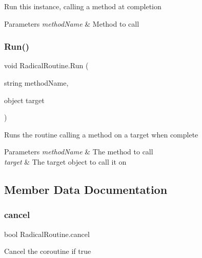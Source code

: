 Run this instance, calling a method at completion 


\begin{DoxyParams}{Parameters}
{\em method\+Name} & Method to call \\
\hline
\end{DoxyParams}
\mbox{\label{class_radical_routine_ab638af87a31b27630da41523771ea764}} 
\subsubsection{\texorpdfstring{Run()}{Run()}\hspace{0.1cm}{\footnotesize\ttfamily [5/5]}}
{\footnotesize\ttfamily void Radical\+Routine.\+Run (\begin{DoxyParamCaption}\item[{string}]{method\+Name,  }\item[{object}]{target }\end{DoxyParamCaption})\hspace{0.3cm}{\ttfamily [inline]}}



Runs the routine calling a method on a target when complete 


\begin{DoxyParams}{Parameters}
{\em method\+Name} & The method to call \\
\hline
{\em target} & The target object to call it on \\
\hline
\end{DoxyParams}


\subsection{Member Data Documentation}
\mbox{\label{class_radical_routine_a6df3c3e067bcfb939c9d1b6c0e08cc9c}} 
\subsubsection{\texorpdfstring{cancel}{cancel}}
{\footnotesize\ttfamily bool Radical\+Routine.\+cancel}



Cancel the coroutine if true 

